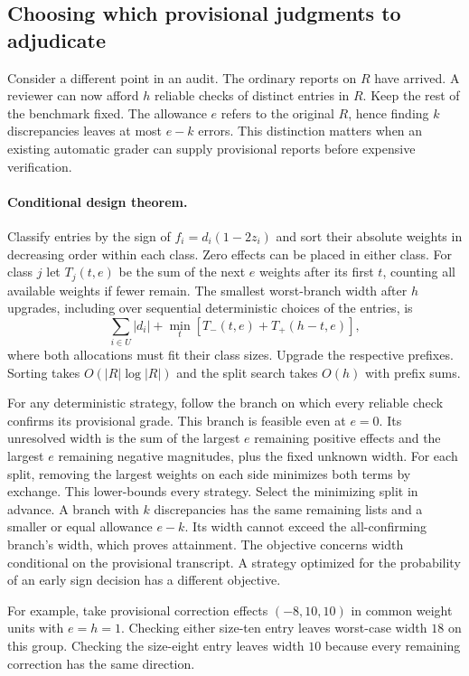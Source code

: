 \subsection{Choosing which provisional judgments to adjudicate}
Consider a different point in an audit. The ordinary reports on $R$ have arrived. A reviewer can now afford $h$ reliable checks of distinct entries in $R$. Keep the rest of the benchmark fixed. The allowance $e$ refers to the original $R$, hence finding $k$ discrepancies leaves at most $e-k$ errors. This distinction matters when an existing automatic grader can supply provisional reports before expensive verification.

\paragraph{Conditional design theorem.}
Classify entries by the sign of $f_i=d_i(1-2z_i)$ and sort their absolute weights in decreasing order within each class. Zero effects can be placed in either class. For class $j$ let $T_j(t,e)$ be the sum of the next $e$ weights after its first $t$, counting all available weights if fewer remain. The smallest worst-branch width after $h$ upgrades, including over sequential deterministic choices of the entries, is
\[
 \sum_{i\in U}|d_i|+\min_{t}\left[T_-(t,e)+T_+(h-t,e)\right],
\]
where both allocations must fit their class sizes. Upgrade the respective prefixes. Sorting takes $O(|R|\log |R|)$ and the split search takes $O(h)$ with prefix sums.

For any deterministic strategy, follow the branch on which every reliable check confirms its provisional grade. This branch is feasible even at $e=0$. Its unresolved width is the sum of the largest $e$ remaining positive effects and the largest $e$ remaining negative magnitudes, plus the fixed unknown width. For each split, removing the largest weights on each side minimizes both terms by exchange. This lower-bounds every strategy. Select the minimizing split in advance. A branch with $k$ discrepancies has the same remaining lists and a smaller or equal allowance $e-k$. Its width cannot exceed the all-confirming branch's width, which proves attainment. The objective concerns width conditional on the provisional transcript. A strategy optimized for the probability of an early sign decision has a different objective.

For example, take provisional correction effects $(-8,10,10)$ in common weight units with $e=h=1$. Checking either size-ten entry leaves worst-case width $18$ on this group. Checking the size-eight entry leaves width $10$ because every remaining correction has the same direction.


